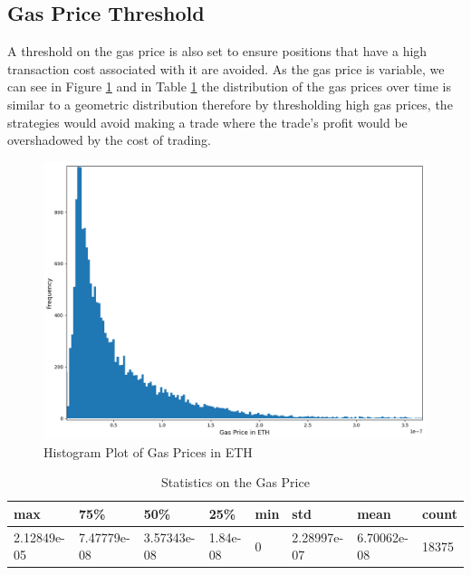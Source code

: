 \subsection{Gas Price Threshold}
A threshold on the gas price is also set to ensure positions that have a high transaction cost associated with it are avoided. As the gas price is variable, we can see in Figure \ref{fig:GasPriceHistogram} and in Table \ref{tab:gasPriceStats} the distribution of the gas prices over time is similar to a geometric distribution therefore by thresholding high gas prices, the strategies would avoid making a trade where the trade's profit would be overshadowed by the cost of trading.
\begin{figure}[h!]
    \centering
    \includegraphics[width=\linewidth]{evaluation/Images/GasPriceHistogram.png}
    \caption{Histogram Plot of Gas Prices in ETH}
    \label{fig:GasPriceHistogram}
\end{figure}

\begin{table}[H]
    \centering
    \begin{tabular}{|l|l|l|l|l|l|l|l|}
    \hline
        max & 75\% & 50\% & 25\% & min & std & mean & count \\ \hline
        2.12849e-05 & 7.47779e-08 & 3.57343e-08 & 1.84e-08 & 0 & 2.28997e-07 & 6.70062e-08 & 18375 \\ \hline
    \end{tabular}
    \caption{Statistics on the Gas Price}
\label{tab:gasPriceStats}
\end{table}

